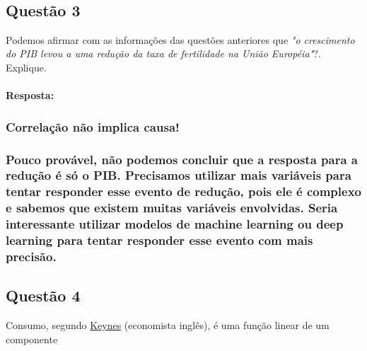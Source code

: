 \documentclass[11pt]{article}
\begin{document}
    \begin{center}
    \end{center}
    { \hspace*{\fill} \\}
    
    \subsection{Questão 3}\label{questuxe3o-3}

Podemos afirmar com as informações das questões anteriores que \emph{"o
crescimento do PIB levou a uma redução da taxa de fertilidade na União
Européia"}?. Explique.

    \paragraph{Resposta:}\label{resposta}

    \subsubsection{Correlação não implica
causa!}\label{correlauxe7uxe3o-nuxe3o-implica-causa}

\subsubsection{Pouco provável, não podemos concluir que a resposta para
a redução é só o PIB. Precisamos utilizar mais variáveis para tentar
responder esse evento de redução, pois ele é complexo e sabemos que
existem muitas variáveis envolvidas. Seria interessante utilizar modelos
de machine learning ou deep learning para tentar responder esse evento
com mais
precisão.}\label{pouco-provuxe1vel-nuxe3o-podemos-concluir-que-a-resposta-para-a-reduuxe7uxe3o-uxe9-suxf3-o-pib.-precisamos-utilizar-mais-variuxe1veis-para-tentar-responder-esse-evento-de-reduuxe7uxe3o-pois-ele-uxe9-complexo-e-sabemos-que-existem-muitas-variuxe1veis-envolvidas.-seria-interessante-utilizar-modelos-de-machine-learning-ou-deep-learning-para-tentar-responder-esse-evento-com-mais-precisuxe3o.}

    \subsection{Questão 4}\label{questuxe3o-4}

Consumo, segundo
\href{https://en.wikipedia.org/wiki/John_Maynard_Keynes}{Keynes}
(economista inglês), é uma função linear de um componente
\end{document}
